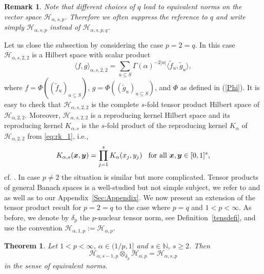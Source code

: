 \documentclass[12pt]{article}
\newtheorem{theorem}{Theorem}
\newtheorem{remark}{Remark}
\newcommand{\bsx}{\boldsymbol{x}}
\newcommand{\bsy}{\boldsymbol{y}}
\newcommand{\HH}{\mathcal{H}}
\newcommand{\N}{\mathbb{N}}
\begin{document}
\begin{remark}\label{s:q_egal}
Note that different choices of $q$ lead to equivalent norms
on the vector space $\HH_{\alpha,s,p}$.  Therefore we often suppress the reference to $q$ and write simply $\HH_{\alpha,s,p}$  instead of $\HH_{\alpha,s,p,q}$.
\end{remark}

Let us close the subsection by considering the case $p=2=q$.
In this case $\HH_{\alpha,s,2,2}$ is a Hilbert space with scalar
product
\begin{equation*}
\langle f,g \rangle_{\alpha,s,2,2} =
\sum_{u\subseteq S} \Gamma(\alpha)^{-2|u|}
\langle \tilde{f}_u,\tilde{g}_u \rangle,
\end{equation*}
where $f= \Phi((\tilde{f}_u)_{u\subseteq S})$,
$g = \Phi((\tilde{g}_u)_{u\subseteq S})$,
and $\Phi$ as defined in (\ref{Phi}).
It is easy to check that $\HH_{\alpha,s,2,2}$ is the complete $s$-fold
tensor product Hilbert space of $\HH_{\alpha,2,2}$.
Moreover, $\HH_{\alpha,s,2,2}$ is a reproducing kernel Hilbert space
and its reproducing kernel $K_{\alpha,s}$ is the $s$-fold product
of the reproducing kernel $K_\alpha$ of $\HH_{\alpha,2,2}$ from \eqref{eq:rk_1}, i.e.,
\begin{equation*}
K_{\alpha,s}(\bsx,\bsy) = \prod^s_{j=1} K_{\alpha}(x_j,y_j)
\hspace{2ex}\text{for all $\bsx, \bsy\in [0,1]^s$,}
\end{equation*}
cf. \cite{Aro50}.
In case $p \neq 2$ the situation is similar but more complicated.
Tensor products of general Banach spaces is a well-studied but not simple subject,
we refer to \cite{LiCh} and \cite{DF} as well as to our Appendix~\ref{Sec:Appendix}. 
We now present an extension of the tensor product result for $p=2=q$ to the case where $p=q$ and $1 < p < \infty$.
As before, we denote by $\delta_p$ the $p$-nuclear tensor norm, see Definition~\ref{tensdefi},
and use the convention $\HH_{\alpha,1,p} := \HH_{\alpha,p}$.

\begin{theorem}\label{tensor3}
 Let $1 <p<\infty$, $\alpha \in (1/p,1]$ and $s\in \N$, $s\ge 2$.
 Then
 \[
 \HH_{\alpha,s-1,p}  \otimes_{\delta_p}\HH_{\alpha,p} =  \HH_{\alpha,s,p} 
 \]
 in the sense of equivalent norms.
\end{theorem}
\end{document}

